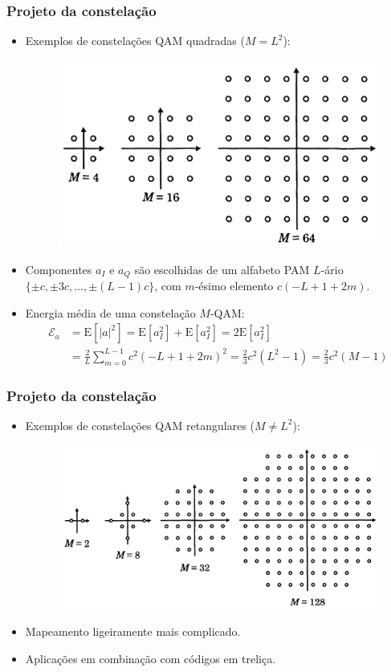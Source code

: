 \begin{frame}
	\frametitle{Projeto da constelação}

	\begin{itemize}
	    \item Exemplos de constelações QAM quadradas ($M=L^2$):
	    \begin{figure}[t]	
	    \begin{center}
	      \includegraphics[width=0.45\columnwidth]{figs/pam_18}
	    \end{center}
	  \end{figure}
	    \item Componentes $a_I$ e $a_Q$ são escolhidas de um alfabeto PAM $L$-ário $\{ \pm c, \pm 3c, \ldots, \pm (L-1)c \}$, com $m$-ésimo elemento $c(-L+1+2m)$.
	    \item Energia média de uma constelação $M$-QAM:
	    \small
	    \begin{align*}
		  \mathcal{E}_a &= \mathrm{E}[|a|^2] = \mathrm{E}[a_I^2] + \mathrm{E}[a_I^2] = 2 \mathrm{E}[a_I^2] \\
		  &= \frac{2}{L}\sum_{m=0}^{L-1} c^2(-L+1+2m)^2 = \frac{2}{3}c^2(L^2-1) = \frac{2}{3}c^2(M-1)
	    \end{align*}
	\end{itemize}	
\end{frame}

\begin{frame}
	\frametitle{Projeto da constelação}

	\begin{itemize}
	    \item Exemplos de constelações QAM retangulares ($M\neq L^2$):
	    \begin{figure}[t]	
	    \begin{center}
	      \includegraphics[width=0.55\columnwidth]{figs/pam_19}
	    \end{center}
	  \end{figure}
	    \item Mapeamento ligeiramente mais complicado.
	    \item Aplicações em combinação com códigos em treliça.
	\end{itemize}	
\end{frame}

